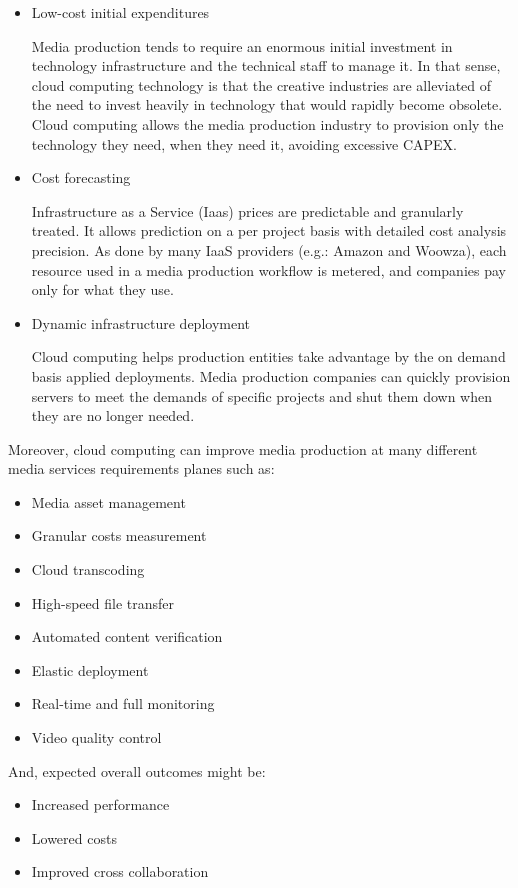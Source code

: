 \begin{itemize}
\item Low-cost initial expenditures \hfill 

Media production tends to require an enormous initial investment in technology infrastructure and the technical staff to manage it. In that sense, cloud computing technology is that the creative industries are alleviated of the need to invest heavily in technology that would rapidly become obsolete. Cloud computing allows the media production industry to provision only the technology they need, when they need it, avoiding excessive CAPEX.

\item Cost forecasting\hfill 

Infrastructure as a Service (Iaas) prices are predictable and granularly treated. It allows prediction on a per project basis with detailed cost analysis precision. As done by many IaaS providers (e.g.: Amazon and Woowza), each resource used in a media production workflow is metered, and companies pay only for what they use.

\item Dynamic infrastructure deployment \hfill 

Cloud computing helps production entities take advantage by the on demand basis applied deployments. Media production companies can quickly provision servers to meet the demands of specific projects and shut them down when they are no longer needed.
\end{itemize}

Moreover, cloud computing can improve media production at many different media services requirements planes such as:

\begin{itemize}
\item Media asset management
\item Granular costs measurement
\item Cloud transcoding
\item High-speed file transfer
\item Automated content verification
\item Elastic deployment
\item Real-time and full monitoring
\item Video quality control
\end{itemize}

And, expected overall outcomes might be:

\begin{itemize}
\item Increased performance
\item Lowered costs
\item Improved cross collaboration
\end{itemize}


